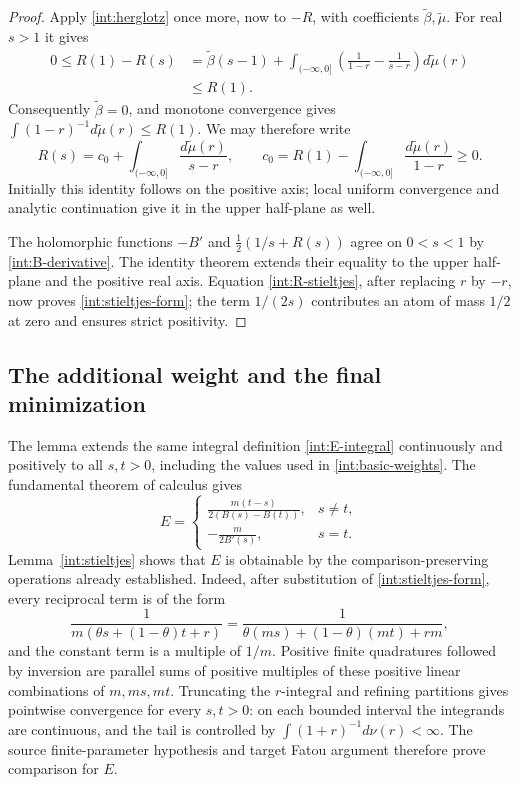 \begin{proof}
Apply \eqref{int:herglotz} once more, now to $-R$, with coefficients
$\widetilde\beta,\widetilde\mu$.  For real $s>1$ it gives
\begin{align*}
 0\le R(1)-R(s)
 &=\widetilde\beta(s-1)
   +\int_{(-\infty,0]}
      \left(\frac1{1-r}-\frac1{s-r}\right)d\widetilde\mu(r)\\
 &\le R(1).
\end{align*}
Consequently $\widetilde\beta=0$, and monotone convergence gives
$\int(1-r)^{-1}d\widetilde\mu(r)\le R(1)$.  We may therefore write
\begin{equation}\label{int:R-stieltjes}
 R(s)=c_0+\int_{(-\infty,0]}\frac{d\widetilde\mu(r)}{s-r},
 \qquad
 c_0=R(1)-\int_{(-\infty,0]}\frac{d\widetilde\mu(r)}{1-r}\ge0.
\end{equation}
Initially this identity follows on the positive axis; local uniform
convergence and analytic continuation give it in the upper half-plane
as well.

The holomorphic functions $-B'$ and $\tfrac12(1/s+R(s))$ agree on
$0<s<1$ by \eqref{int:B-derivative}. The identity theorem extends their
equality to the upper half-plane and the positive real axis. Equation
\eqref{int:R-stieltjes}, after replacing $r$ by $-r$, now proves
\eqref{int:stieltjes-form}; the term $1/(2s)$ contributes an atom
of mass $1/2$ at zero and ensures strict positivity.
\end{proof}

\subsection{The additional weight and the final minimization}

The lemma extends the same integral definition \eqref{int:E-integral}
continuously and positively to all $s,t>0$, including the values used in
\eqref{int:basic-weights}. The fundamental theorem of calculus gives
\begin{equation}\label{int:E}
 E=
 \begin{cases}
 \displaystyle\frac{m(t-s)}{2(B(s)-B(t))},&s\ne t,\\[6pt]
 \displaystyle-\frac{m}{2B'(s)},&s=t.
\end{cases}
\end{equation}
Lemma~\ref{int:stieltjes} shows that $E$ is obtainable by the
comparison-preserving operations already established.  Indeed, after
substitution of \eqref{int:stieltjes-form}, every reciprocal term is
of the form
\[
 \frac1{m(\theta s+(1-\theta)t+r)}
 =\frac1{\theta(ms)+(1-\theta)(mt)+rm},
\]
and the constant term is a multiple of $1/m$.
Positive finite quadratures followed by inversion are parallel sums
of positive multiples of these positive linear combinations of
$m,ms,mt$.  Truncating the $r$-integral and refining partitions gives
pointwise convergence for every $s,t>0$: on each bounded interval the
integrands are continuous, and the tail is controlled by
$\int(1+r)^{-1}d\nu(r)<\infty$.
The source finite-parameter hypothesis and target Fatou argument
therefore prove comparison for $E$.

